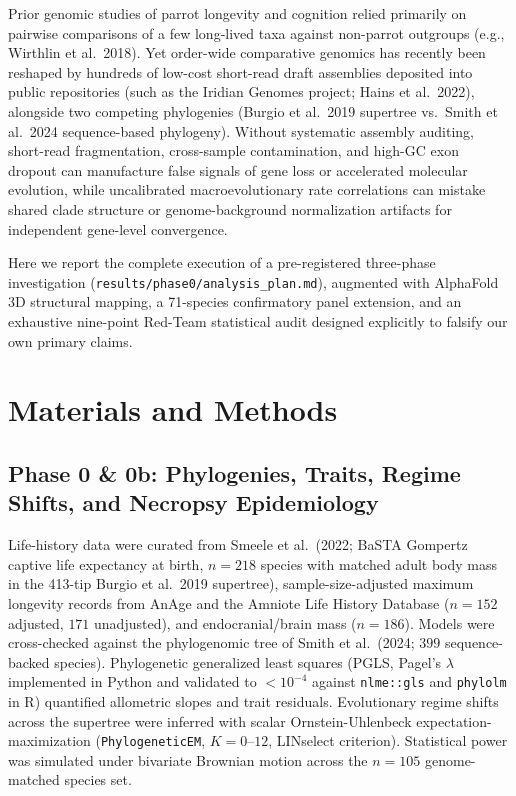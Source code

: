 \documentclass[10pt,a4paper,twocolumn]{article}
\begin{document}
Prior genomic studies of parrot longevity and cognition relied primarily on pairwise comparisons of a few long-lived taxa against non-parrot outgroups (e.g., Wirthlin et al.\ 2018). Yet order-wide comparative genomics has recently been reshaped by hundreds of low-cost short-read draft assemblies deposited into public repositories (such as the Iridian Genomes project; Hains et al.\ 2022), alongside two competing phylogenies (Burgio et al.\ 2019 supertree vs.\ Smith et al.\ 2024 sequence-based phylogeny). Without systematic assembly auditing, short-read fragmentation, cross-sample contamination, and high-GC exon dropout can manufacture false signals of gene loss or accelerated molecular evolution, while uncalibrated macroevolutionary rate correlations can mistake shared clade structure or genome-background normalization artifacts for independent gene-level convergence.

Here we report the complete execution of a pre-registered three-phase investigation (\texttt{results/phase0/analysis\_plan.md}), augmented with AlphaFold 3D structural mapping, a 71-species confirmatory panel extension, and an exhaustive nine-point Red-Team statistical audit designed explicitly to falsify our own primary claims.

\section{Materials and Methods}

\subsection{Phase 0 \& 0b: Phylogenies, Traits, Regime Shifts, and Necropsy Epidemiology}
Life-history data were curated from Smeele et al.\ (2022; BaSTA Gompertz captive life expectancy at birth, $n = 218$ species with matched adult body mass in the 413-tip Burgio et al.\ 2019 supertree), sample-size-adjusted maximum longevity records from AnAge and the Amniote Life History Database ($n = 152$ adjusted, $171$ unadjusted), and endocranial/brain mass ($n = 186$). Models were cross-checked against the phylogenomic tree of Smith et al.\ (2024; $399$ sequence-backed species). Phylogenetic generalized least squares (PGLS, Pagel's $\lambda$ implemented in Python and validated to $<10^{-4}$ against \texttt{nlme::gls} and \texttt{phylolm} in R) quantified allometric slopes and trait residuals. Evolutionary regime shifts across the supertree were inferred with scalar Ornstein-Uhlenbeck expectation-maximization (\texttt{PhylogeneticEM}, $K = 0$--$12$, LINselect criterion). Statistical power was simulated under bivariate Brownian motion across the $n = 105$ genome-matched species set.
\end{document}
